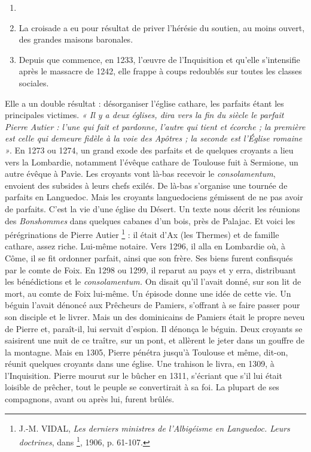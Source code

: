 \documentclass[french,twoside]{book} %
\begin{document}
\label{p108}
\begin{enumerate}[itemsep=0pt,]
\item[] \hspace{-1.5em}{\bfseries Quels résultats ? Il faut distinguer les étapes :}
\item La croisade a eu pour résultat de priver l’hérésie du soutien, au moins ouvert, des grandes maisons baronales.
\item Depuis que commence, en 1233, l’œuvre de l’Inquisition et qu’elle s’intensifie après le massacre de 1242, elle frappe à coups redoublés sur toutes les classes sociales.

\end{enumerate}\noindent Elle a un double résultat : désorganiser l’église cathare, les parfaits étant les principales victimes. \emph{« Il y a deux églises, dira vers la fin du siècle le parfait Pierre Autier : l’une qui fait et pardonne, l’autre qui tient et écorche ; la première est celle qui demeure fidèle à la voie des Apôtres ; la seconde est l’Église romaine »}. En 1273 ou 1274, un grand exode des parfaits et de quelques croyants a lieu vers la Lombardie, notamment l’évêque cathare de Toulouse fuit à Sermione, un autre évêque à Pavie. Les croyants vont là-bas recevoir le {\itshape consolamentum}, envoient des subsides à leurs chefs exilés. De là-bas s’organise une tournée de parfaits en Languedoc. Mais les croyants languedociens gémissent de ne pas avoir de parfaits. C’est la vie d’une église du Désert. Un texte nous décrit les réunions des {\itshape Bonshommes} dans quelques cabanes d’un bois, près de Palajac. Et voici les pérégrinations de Pierre Autier \footnote{ J.-M. VIDAL, {\itshape Les derniers ministres de l’Albigéisme en Languedoc. Leurs doctrines}, dans \href{http://gallica.bnf.fr/document?O=N016999}{}\footnote{\href{http://gallica.bnf.fr/document?O=N016999}{\url{http://gallica.bnf.fr/document?O=N016999}}}, 1906, p. 61-107.} : il était d’Ax (les Thermes) et de famille cathare, assez riche. Lui-même notaire. Vers 1296, il alla en Lombardie où, à Côme, il se fit ordonner parfait, ainsi que son frère. Ses biens furent confisqués par le comte de Foix. En 1298 ou 1299, il reparut au pays et y erra, distribuant les bénédictions et le {\itshape consolamentum.} On disait qu’il l’avait donné, sur son lit de mort, au comte de Foix lui-même. Un épisode donne une idée de cette vie. Un béguin l’avait dénoncé aux Prêcheurs de Pamiers, s’offrant à se faire passer pour son disciple et le livrer. Mais un des dominicains de Pamiers était le propre neveu de Pierre et, paraît-il, lui servait d’espion. Il dénonça le béguin. Deux croyants se saisirent une nuit de ce traître, sur un pont, et allèrent le jeter dans un gouffre de la montagne. Mais en 1305, Pierre pénétra jusqu’à Toulouse et même, dit-on, réunit quelques croyants dans une église. Une trahison le livra, en 1309, à l’Inquisition. Pierre mourut sur le bûcher en 1311, s’écriant que s’il lui était loisible de prêcher, tout le peuple se convertirait à sa foi. La plupart de ses compagnons, avant ou après lui, furent brûlés.\par
\end{document}
